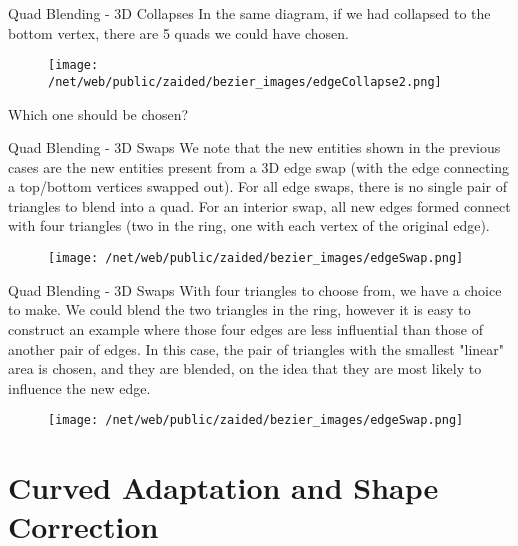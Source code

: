 \documentclass[12pt]{beamer}
\newcommand{\spa}{\vspace{0.5cm}\newline}
\begin{document}
\begin{frame}{Quad Blending - 3D Collapses}
In the same diagram, if we had collapsed to the bottom vertex, there are 5 quads we could have chosen.
\begin{figure}
  \centering
  \texttt{[image: /net/web/public/zaided/bezier\_images/edgeCollapse2.png]} 
\end{figure}
Which one should be chosen?
\end{frame}
\begin{frame}{Quad Blending - 3D Swaps}
We note that the new entities shown in the previous cases are the new entities present from a 3D edge swap (with the edge connecting a top/bottom vertices swapped out). \spa For all edge swaps, there is no single pair of triangles to blend into a quad. For an interior swap, all new edges formed connect with four triangles (two in the ring, one with each vertex of the original edge).
\begin{figure}
  \centering
  \texttt{[image: /net/web/public/zaided/bezier\_images/edgeSwap.png]} 
\end{figure}
\end{frame}
\begin{frame}{Quad Blending - 3D Swaps}
With four triangles to choose from, we have a choice to make. We could blend the two triangles in the ring, however it is easy to construct an example where those four edges are less influential than those of another pair of edges. In this case, the pair of triangles with the smallest "linear" area is chosen, and they are blended, on the idea that they are most likely to influence the new edge.
\begin{figure}
  \centering
  \texttt{[image: /net/web/public/zaided/bezier\_images/edgeSwap.png]} 
\end{figure}
\end{frame}
\section{Curved Adaptation and Shape Correction}
\end{document}
